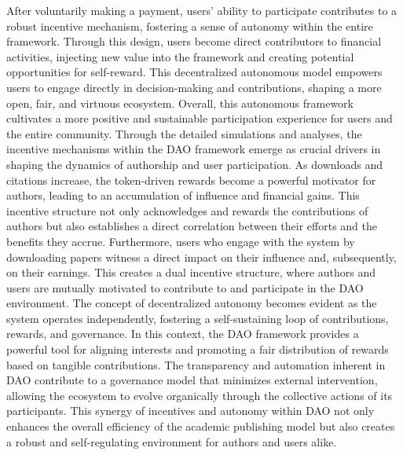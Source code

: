 \documentclass[lettersize,journal]{IEEEtran}
\begin{document}
After voluntarily making a payment, users' ability to participate contributes to a robust incentive mechanism, fostering a sense of autonomy within the entire framework. Through this design, users become direct contributors to financial activities, injecting new value into the framework and creating potential opportunities for self-reward. This decentralized autonomous model empowers users to engage directly in decision-making and contributions, shaping a more open, fair, and virtuous ecosystem. Overall, this autonomous framework cultivates a more positive and sustainable participation experience for users and the entire community.
Through the detailed simulations and analyses, the incentive mechanisms within the DAO framework emerge as crucial drivers in shaping the dynamics of authorship and user participation. As downloads and citations increase, the token-driven rewards become a powerful motivator for authors, leading to an accumulation of influence and financial gains. This incentive structure not only acknowledges and rewards the contributions of authors but also establishes a direct correlation between their efforts and the benefits they accrue.
Furthermore, users who engage with the system by downloading papers witness a direct impact on their influence and, subsequently, on their earnings. This creates a dual incentive structure, where authors and users are mutually motivated to contribute to and participate in the DAO environment. The concept of decentralized autonomy becomes evident as the system operates independently, fostering a self-sustaining loop of contributions, rewards, and governance.
In this context, the DAO framework provides a powerful tool for aligning interests and promoting a fair distribution of rewards based on tangible contributions. The transparency and automation inherent in DAO contribute to a governance model that minimizes external intervention, allowing the ecosystem to evolve organically through the collective actions of its participants. This synergy of incentives and autonomy within DAO not only enhances the overall efficiency of the academic publishing model but also creates a robust and self-regulating environment for authors and users alike.
\end{document}
